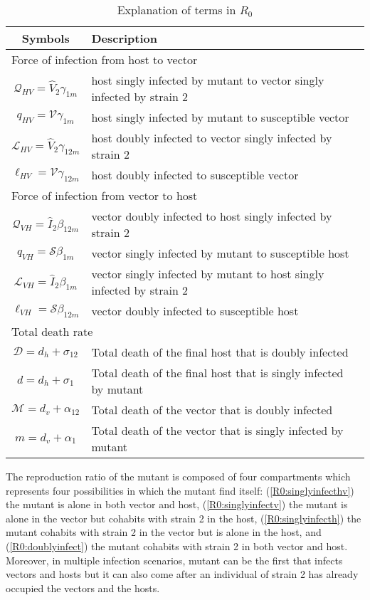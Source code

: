 \documentclass{article}
\begin{document}
\begin{table}[!h]
    \centering
    \begin{tabular}{|c|l|}
    \hline
        Symbols &  Description \\
    \hline
    \multicolumn{2}{|l|}{Force of infection from host to vector} \\
    \hline
       $\mathcal{Q}_{HV} = \hat{V}_2 \gamma_{1m}$ & host singly infected by mutant to vector singly infected by strain 2 \\
    \hline
       $ \mathit{q}_{HV} = \mathcal{V} \gamma_{1m}$ & host singly infected by mutant to susceptible vector \\
    \hline
       $\mathcal{L}_{HV} = \hat{V}_2 \gamma_{12m}$ & host doubly infected to vector singly infected by strain 2 \\
    \hline
       $\ell_{HV} = \mathcal{V} \gamma_{12m}$ & host doubly infected to susceptible vector \\
    \hline
    \multicolumn{2}{|l|}{Force of infection from vector to host} \\
    \hline
       $\mathcal{Q}_{VH} = \hat{I}_2 \beta_{12m}$ & vector doubly infected to host singly infected by strain 2 \\
    \hline
       $\mathit{q}_{VH} = \mathcal{S} \beta_{1m}$ &  vector singly infected by mutant to susceptible host \\
     \hline
       $\mathcal{L}_{VH} = \hat{I}_2 \beta_{1m}$ & vector singly infected by mutant to host singly infected by strain 2 \\
    \hline
       $\ell_{VH} = \mathcal{S} \beta_{12m}$ &  vector doubly infected to susceptible host \\
    \hline
    \multicolumn{2}{|l|}{Total death rate} \\
       $\mathcal{D} = d_h + \sigma_{12}$ & Total death of the final host that is doubly infected \\
     \hline
       $\mathit{d} = d_h + \sigma_1$ & Total death of the final host that is singly infected by mutant \\
    \hline
       $\mathcal{M} = d_v + \alpha_{12}$ & Total death of the vector that is doubly infected \\
    \hline
       $\mathit{m} = d_v + \alpha_1$ & Total death of the vector that is singly infected by mutant \\
    \hline
    \end{tabular}
    \caption{Explanation of terms in $R_0$}
    \label{table:R0annotation}
\end{table}The reproduction ratio of the mutant is composed of four compartments which represents four possibilities in which the mutant find itself: (\ref{R0:singlyinfecthv}) the mutant is alone in both vector and host, (\ref{R0:singlyinfectv}) the mutant is alone in the vector but cohabits with strain 2 in the host, (\ref{R0:singlyinfecth}) the mutant cohabits with strain 2 in the vector but is alone in the host, and (\ref{R0:doublyinfect}) the mutant cohabits with strain 2 in both vector and host. Moreover, in multiple infection scenarios, mutant can be the first that infects vectors and hosts but it can also come after an individual of strain 2 has already occupied the vectors and the hosts.
\end{document}
